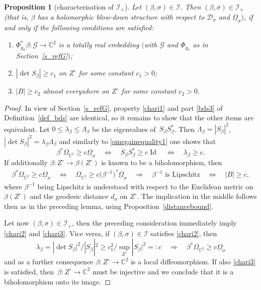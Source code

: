 \documentclass[10pt,a4paper]{amsart}
\numberwithin{equation}{section}
\newtheorem{Proposition}[Theorem]{Proposition}
\theoremstyle{definition}
\newcommand{\C}{\mathbb{C}} %
\newcommand{\1}{{\bf 1}}
\newcommand{\Om}{{\underline{\Omega}}}
\newcommand{\D}{\mathscr{D}}
\begin{document}
\begin{Proposition}[characterisation of $\mathcal I_+$]\label{chari}
	Let $(\beta,\sigma)\in \mathcal I$. Then $(\beta,\sigma)\in \mathcal I_+$ {\rm(}that is, $\beta$ has a holomorphic blow-down structure with respect to $\D_\sigma$ and $\Om_\sigma)$, if and only if the following conditions are satisfied:
	\begin{enumerate}[label=\rm(\roman*)]\itemsep=0pt
		\item\label{chari1} $\Phi_{g_\sigma}^*\beta \colon\mathcal G \rightarrow \C^2$ is a totally real embedding $($with $\mathcal G$ and $\Phi_{g_\sigma}$ as in Section~{\rm\ref{s_refG}}$)$;
		
		\item \label{chari2} $|{\det S_\beta}|\ge c_1$ on $Z^\circ$ for some constant $c_1>0$;
		
		\item \label{chari3} $|B|\ge c_2$ almost everywhere on $Z^\circ$ for some constant $c_2>0$.
	\end{enumerate}
\end{Proposition}

\begin{proof} In view of Section~\ref{s_refG}, property \ref{chari1} and part \ref{bds3} of Definition~\ref{def_bds} are identical, so it remains to show that the other items are equivalent.
Let $0\le \lambda_\beta\le \Lambda_\beta$ be the eigenvalues of~$S_\beta S_\beta^*$. Then $\Lambda_\beta = |S_\beta|^2$, $|{\det S_\beta}|^2 = \lambda_\beta \Lambda_\beta$ and similarly to \eqref{omegainequality1} one shows that
 \[%
\beta^*\Omega_{\C^2} \ge c \Om_\sigma\quad \Leftrightarrow \quad S_\beta S_\beta^* \ge c \operatorname{Id} \quad \Leftrightarrow \quad \lambda_\beta \ge c.
\]
If additionally $\beta\colon Z^\circ\rightarrow \beta(Z^\circ)$ is known to be a biholomorphism, then
 \begin{gather*}
\beta^*\Omega_{\C^2} \ge c \Om_\sigma\quad \Leftrightarrow \quad \Omega_{\C^2} \ge c\bigl(\beta^{-1}\bigr)^*\Om_\sigma \quad\Rightarrow \quad \beta^{-1} \text{ is Lipschitz} \quad \Leftrightarrow \quad |B|\ge c,
\end{gather*}
where $\beta^{-1}$ being Lipschitz is understood with respect to the Euclidean metric on $\beta(Z^\circ)$ and the geodesic distance $d_\sigma$ on $Z^\circ$. The implication in the middle follows then as in the preceding lemma, using Proposition~\ref{distancebound}.

Let now $(\beta,\sigma)\in \mathcal I_+$, then the preceding consideration immediately imply \ref{chari2} and \ref{chari3}. Vice versa, if $(\beta,\sigma)\in \mathcal I$ satisfies \ref{chari2}, then \[
\lambda_\beta = |{\det S_\beta|^2/}|S_\beta|^2
 \ge c_1^2/\sup_{Z^\circ}|S_\beta|^2=:c \quad \Rightarrow \quad \beta^*\Omega_{\C^2} \ge c \Om_\sigma
\]
and as a further consequence $\beta\colon Z^\circ\rightarrow \C^2$ is a local diffeomorphism.
If also \ref{chari3} is satisfied, then~${\beta\colon Z^\circ \rightarrow \C^2}$ must be injective and we conclude that it is a biholomorphism onto its image.
\end{proof}
\end{document}
